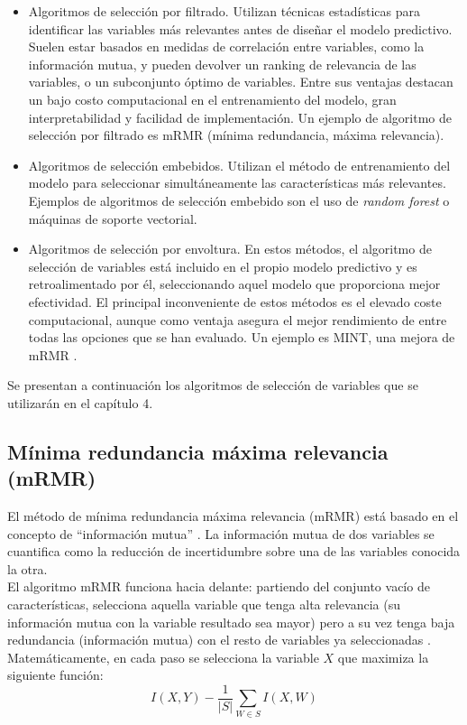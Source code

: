 \begin{itemize}
	\item Algoritmos de selección por filtrado. Utilizan técnicas estadísticas para identificar las variables más relevantes antes de diseñar el modelo predictivo. Suelen estar basados en medidas de correlación entre variables, como la información mutua, y pueden devolver un ranking de relevancia de las variables, o un subconjunto óptimo de variables. Entre sus ventajas destacan un bajo costo computacional en el entrenamiento del modelo, gran interpretabilidad y facilidad de implementación. Un ejemplo de algoritmo de selección por filtrado es mRMR (mínima redundancia, máxima relevancia). 
	
	\item Algoritmos de selección embebidos. Utilizan el método de entrenamiento del modelo para seleccionar simultáneamente las características más relevantes. Ejemplos de algoritmos de selección embebido son el uso de \textit{random forest} o máquinas de soporte vectorial. 
	
	\item Algoritmos de selección por envoltura. En estos métodos, el algoritmo de selección de variables está incluido en el propio modelo predictivo y es retroalimentado por él, seleccionando aquel modelo que proporciona mejor efectividad. El principal inconveniente de estos métodos es el elevado coste computacional, aunque como ventaja asegura el mejor rendimiento de entre todas las opciones que se han evaluado. Un ejemplo es MINT, una mejora de mRMR \cite{He2016}.
\end{itemize}

Se presentan a continuación los algoritmos de selección de variables que se utilizarán en el capítulo 4.

\subsection{Mínima redundancia máxima relevancia (mRMR)}

El método de mínima redundancia máxima relevancia (mRMR) está basado en el concepto de ``información mutua'' \cite{Koller1996}. La información mutua de dos variables se cuantifica como la reducción de incertidumbre sobre una de las variables conocida la otra.\\

El algoritmo mRMR funciona hacia delante: partiendo del conjunto vacío de características, selecciona aquella variable que tenga alta relevancia (su información mutua con la variable resultado sea mayor) pero a su vez tenga baja redundancia (información mutua) con el resto de variables ya seleccionadas \cite{HanchuanPeng2005}. Matemáticamente, en cada paso se selecciona la variable $X$ que maximiza la siguiente función: $$I(X,Y) - \dfrac{1}{\rvert S \rvert} \sum_{W\in S} I(X, W)$$

